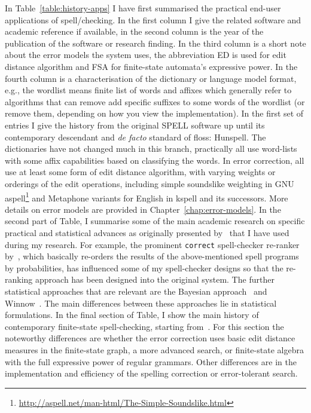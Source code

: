 \documentclass[officiallayout,final]{unihelcompling}
\begin{document}
In Table~\ref{table:history-apps} I have first summarised the practical
end-user applications of spell\-/checking. In the first column I give the
related software and academic reference if available, in the second column is
the year of the publication of the software or research finding. In the third
column is a short note about the error models the system uses, the abbreviation
ED is used for edit distance algorithm and FSA for finite-state automata's
expressive power. In the fourth column is a characterisation of the dictionary
or language model format, e.g., the wordlist means finite list of words and
affixes which generally refer to algorithms that can remove add specific
suffixes to some words of the wordlist (or remove them, depending on how you
view the implementation).  In the first set of entries I give the history from
the original SPELL software up until its contemporary descendant and \emph{de
facto} standard of \gls{floss}: Hunspell. The dictionaries have not changed
much in this branch, practically all use word-lists with some affix
capabilities based on classifying the words. In error correction, all use at
least some form of edit distance algorithm, with varying weights or orderings
of the edit operations, including simple soundslike weighting in GNU
aspell\footnote{\url{http://aspell.net/man-html/The-Simple-Soundslike.html}}
and Metaphone variants for English in kspell and its successors. More details
on error models are provided in  Chapter~\ref{chap:error-models}.  In the
second part of Table, I summarise some of the main academic research on
specific practical and statistical advances as originally presented
by~\citet{al2006learning} that I have used during my research. For example, the
prominent \texttt{correct} spell-checker re-ranker
by~\citet{church1991probability}, which basically re-orders the results of the
above-mentioned spell programs by probabilities, has influenced some of my
spell-checker designs so that the re-ranking approach has been designed into
the original system.  The further statistical approaches that are relevant are
the Bayesian approach~\citep{golding1995bayesian} and
Winnow~\citep{golding1999winnow}. The main differences between these approaches
lie in statistical formulations.  In the final section of Table, I show the
main history of contemporary finite-state spell-checking, starting
from~\citet{oflazer1996errortolerant}.  For this section the noteworthy
differences are whether the error correction uses basic edit distance measures
in the finite-state graph, a more advanced search, or finite-state algebra with
the full expressive power of regular grammars.  Other differences are in the
implementation and efficiency of the spelling correction or error-tolerant
search.
\end{document}
